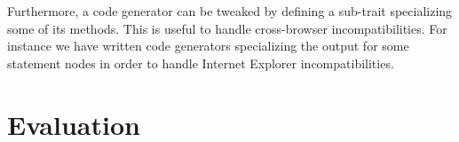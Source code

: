 \documentclass[american,english,runningheads]{llncs}
\newcommand{\eg}{\emph{e.g.}}
\begin{document}
Furthermore, a code generator can be tweaked by defining a sub-trait specializing some of its methods. This is useful
to handle cross-browser incompatibilities. For instance we have written code generators specializing the output for
some statement nodes in order to handle Internet Explorer incompatibilities.

% 
% 
% 
% 
% 
% 

\section{Evaluation}
\label{validation}
\end{document}
